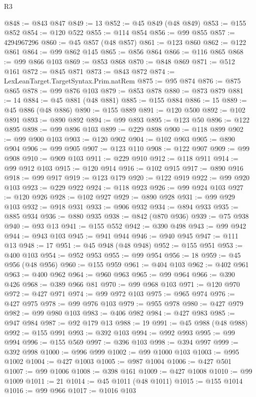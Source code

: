 \begin{lexlean}{R3}
\begin{coremodule}
@848 := @843 @847
@849 := 13
@852 := @45 @849 (@48 @849)
@853 := @155 @852
@854 := @120 @522
@855 := @114 @854
@856 := @99 @855
@857 := 4294967296
@860 := @45 @857 (@48 @857)
@861 := @123 @860
@862 := @122 @861
@864 := @99 @862 @145
@865 := @856 @864
@866 := @116 @865
@868 := @99 @866 @103
@869 := @853 @868
@870 := @848 @869
@871 := @512 @161
@872 := @845 @871
@873 := @843 @872
@874 := LexLeanTarget.TargetSyntax.Prim.natRem
@875 := @95 @874
@876 := @875 @865
@878 := @99 @876 @103
@879 := @853 @878
@880 := @873 @879
@881 := 14
@884 := @45 @881 (@48 @881)
@885 := @155 @884
@886 := 15
@889 := @45 @886 (@48 @886)
@890 := @155 @889
@891 := @120 @500
@892 := @102 @891
@893 := @890 @892
@894 := @99 @893
@895 := @123 @50
@896 := @122 @895
@898 := @99 @896 @103
@899 := @229 @898
@900 := @118 @899
@902 := @99 @900 @103
@903 := @120 @902
@904 := @102 @903
@905 := @890 @904
@906 := @99 @905
@907 := @123 @110
@908 := @122 @907
@909 := @99 @908
@910 := @909 @103
@911 := @229 @910
@912 := @118 @911
@914 := @99 @912 @103
@915 := @120 @914
@916 := @102 @915
@917 := @890 @916
@918 := @99 @917
@919 := @123 @179
@920 := @122 @919
@922 := @99 @920 @103
@923 := @229 @922
@924 := @118 @923
@926 := @99 @924 @103
@927 := @120 @926
@928 := @102 @927
@929 := @890 @928
@931 := @99 @929 @103
@932 := @918 @931
@933 := @906 @932
@934 := @894 @933
@935 := @885 @934
@936 := @880 @935
@938 := @842 (@870 @936)
@939 := @75 @938
@940 := @93 @13
@941 := @155 @552
@942 := @390 @498
@943 := @99 @942
@944 := @943 @103
@945 := @941 @944
@946 := @940 @945
@947 := @111 @13
@948 := 17
@951 := @45 @948 (@48 @948)
@952 := @155 @951
@953 := @400 @103
@954 := @952 @953
@955 := @99 @954
@956 := 18
@959 := @45 @956 (@48 @956)
@960 := @155 @959
@961 := @404 @103
@962 := @402 @961
@963 := @400 @962
@964 := @960 @963
@965 := @99 @964
@966 := @390 @426
@968 := @389 @966 @81
@970 := @99 @968 @103
@971 := @120 @970
@972 := @427 @971
@974 := @99 @972 @103
@975 := @965 @974
@976 := @427 @975
@978 := @99 @976 @103
@979 := @955 @978
@980 := @427 @979
@982 := @99 @980 @103
@983 := @406 @982
@984 := @427 @983
@985 := @947 @984
@987 := @92 @179 @13
@988 := 19
@991 := @45 @988 (@48 @988)
@992 := @155 @991
@993 := @392 @103
@994 := @992 @993
@995 := @99 @994
@996 := @155 @569
@997 := @396 @103
@998 := @394 @997
@999 := @392 @998
@1000 := @996 @999
@1002 := @99 @1000 @103
@1003 := @995 @1002
@1004 := @427 @1003
@1005 := @987 @1004
@1006 := @427 @501
@1007 := @99 @1006
@1008 := @398 @161
@1009 := @427 @1008
@1010 := @99 @1009
@1011 := 21
@1014 := @45 @1011 (@48 @1011)
@1015 := @155 @1014
@1016 := @99 @966
@1017 := @1016 @103

\end{coremodule}
\end{lexlean}
